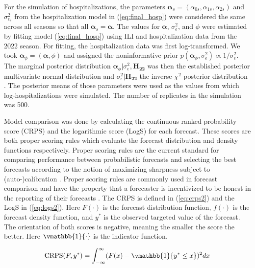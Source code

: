\documentclass[ba]{imsart}
\theoremstyle{plain}
\theoremstyle{definition}
\theoremstyle{remark}
\begin{document}
For the simulation of hospitalizations, the parameters $\boldsymbol{\alpha}_s = (\alpha_{0s}, \alpha_{1s}, \alpha_{2s})$ and $\sigma^2_{\epsilon_s}$ from the hospitalization model in (\ref{eq:final_hosp}) were considered the same across all seasons so that all $\boldsymbol{\alpha}_s = \boldsymbol{\alpha}$. 
The values for $\boldsymbol{\alpha}$, $\sigma^2_{\epsilon}$, and $\phi$ were estimated by fitting model (\ref{eq:final_hosp}) using ILI and hospitalization data from the 2022 season. For fitting, the hospitalization data was first log-transformed. We took $\boldsymbol{\alpha}_{\phi} = (\boldsymbol{\alpha}, \phi)$
and assigned the noninformative prior $p(\boldsymbol{\alpha}_{\phi}, \sigma^2_{\epsilon}) \propto 1/\sigma^2_{\epsilon}$. The marginal posterior distribution $\boldsymbol{\alpha}_{\phi} | \sigma^2_{\epsilon}, \boldsymbol{H_{22}}$ was then the established posterior multivariate normal distribution and $\sigma^2_{\epsilon} | \boldsymbol{H_{22}}$ the inverse-$\chi^2$ posterior distribution \cite[]{gelman2013bayesian}. The posterior means of those parameters were used as the values from which log-hospitalizations were simulated. The number of replicates in the simulation was 500.


Model comparison was done by calculating the continuous ranked probability score (CRPS) and the logarithmic score (LogS) for each forecast. These scores are both proper scoring rules which evaluate the forecast distribution and density functions respectively. Proper scoring rules are the current standard for comparing performance between probabilistic forecasts and selecting the best forecasts according to the notion of maximizing sharpness subject to (auto-)calibration \cite[]{gneiting2007probabilistic, tsyplakov2013evaluation}. Proper scoring rules are commonly used in forecast comparison and have the property that a forecaster is incentivized to be honest in the reporting of their forecasts \cite[]{gneiting2007strictly, gneiting2014probabilistic}. The CRPS is defined in (\ref{eq:crps2}) and the LogS in (\ref{eq:logs2}). Here $F(\cdot)$ is the forecast distribution function, $f(\cdot)$ is the forecast density function, and $y^*$ is the observed targeted value of the forecast. The orientation of both scores is negative, meaning the smaller the score the better. Here $\vmathbb{1}\{\cdot\}$ is the indicator function.

\begin{equation}
    \text{CRPS}(F, y^*) = \int_{-\infty}^{\infty} (F(x) - \vmathbb{1}\{y^* \leq x\})^2 dx
    \label{eq:crps2}
\end{equation}
\end{document}
